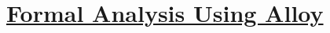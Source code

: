 \section[Formal Analysis Using Alloy]{\hyperlink{toc}{Formal Analysis Using Alloy}}
\label{sec:formalAnalysisUsingAlloy}
